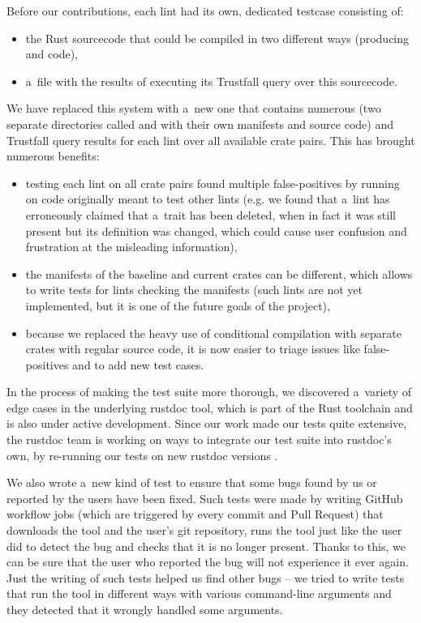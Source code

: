 \documentclass[licencjacka,en]{pracamgr}
\begin{document}
Before our contributions, each lint had its own, dedicated testcase consisting of:
\begin{itemize}
\item the Rust sourcecode that could be compiled in two different ways (producing
 and  code),
\item a~file with the results of executing its Trustfall query over this sourcecode.
\end{itemize}
We have replaced this system with a~new one that contains numerous 
(two separate directories called  and  with their own
manifests and source code) and Trustfall query results for each lint over all
available crate pairs. This has brought numerous benefits:
\begin{itemize}
	\item testing each lint on all crate pairs found multiple false-positives by running
		on code originally meant to test other lints
		(e.g. we found that a~lint has erroneously claimed that a~trait
		has been deleted, when in fact it was still present but its definition
		was changed, which could cause user confusion and frustration at the
		misleading information),
	\item the manifests of the baseline and current crates can be different,
		which allows to write tests for lints checking the manifests
		(such lints are not yet implemented, but it is one of the future goals
		of the project),
	\item because we replaced the heavy use of conditional compilation with separate crates with regular source code,
	    it is now easier to triage issues like false-positives and to add new test cases.
\end{itemize}
In the process of making the test suite more thorough,
we discovered a~variety of edge cases in the underlying rustdoc tool,
which is part of the Rust toolchain and is also under active development.
Since our work made our tests quite extensive,
the rustdoc team is working on ways to integrate our test suite into rustdoc's own,
by re-running our tests on new rustdoc versions \cite{issue-rustdoc-our-tests}.

We also wrote a~new kind of test to ensure that some bugs found by us or reported by the users have been fixed.
Such tests were made by writing GitHub workflow jobs (which are triggered by every
commit and Pull Request) that downloads the tool and the user's git repository,
runs the tool just like the user did to detect the bug
and checks that it is no longer present.
Thanks to this, we can be sure that the user who reported the bug
will not experience it ever again.
Just the writing of such tests helped us find other bugs
-- we tried to write tests that run the tool in different ways
with various command-line arguments and they detected that it wrongly handled some arguments.
\end{document}

